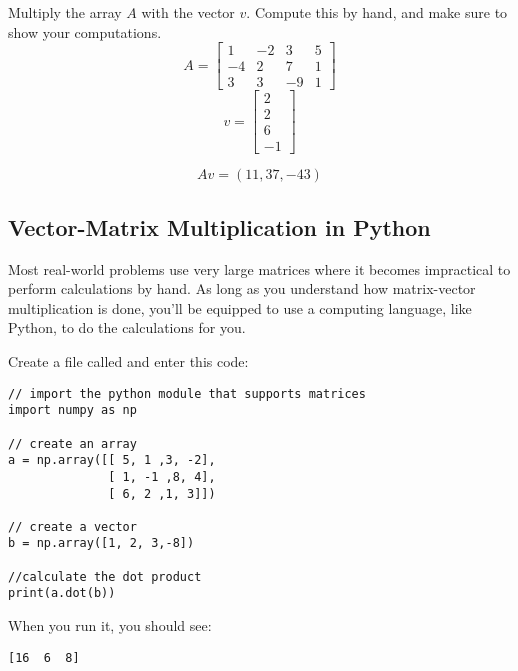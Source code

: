 \begin{Exercise}[title={Vector Matrix Multiplication}, label=vector-matrix-multiply01]
Multiply the array $A$ with the vector $v$. Compute this by hand, and make sure to show your computations. 
$$A = \begin{bmatrix}
 1 &-2  &3 &5  \\
 -4  &2  &7 &1 \\
 3  &3  &-9 &1
\end{bmatrix}$$
	$$v = 
	\begin{bmatrix}
		2 \\
 		2 \\
 		6 \\
 		-1
	\end{bmatrix}$$
\end{Exercise}
\begin{Answer}[ref=vector-matrix-multiply01]
$$Av = (11, 37, -43)$$
\end{Answer}

\subsection{Vector-Matrix Multiplication in Python}
Most real-world problems use very large matrices where it becomes impractical to perform calculations by hand. As long as you understand how matrix-vector multiplication is done, you'll be equipped to use a computing language, like Python, to do the calculations for you. 

Create a file called  and enter this code:

\begin{Verbatim}
// import the python module that supports matrices
import numpy as np

// create an array
a = np.array([[ 5, 1 ,3, -2], 
              [ 1, -1 ,8, 4], 
              [ 6, 2 ,1, 3]])

// create a vector 
b = np.array([1, 2, 3,-8])

//calculate the dot product
print(a.dot(b))
\end{Verbatim}

When you run it, you should see:
\begin{Verbatim}
[16  6  8]
\end{Verbatim}



